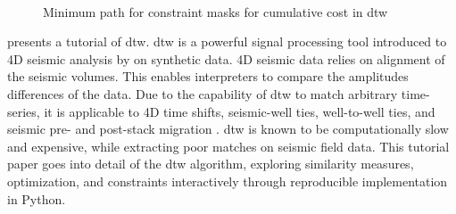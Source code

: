 \begin{figure}[!hb]
    ~
    ~
\caption{Minimum path for constraint masks for cumulative cost in \ac{dtw}}
\label{fig:constraints}
\end{figure} 
\citet{dramsch2019dtw} presents a tutorial of \acf{dtw}. \ac{dtw} is a powerful signal processing tool introduced to 4D seismic analysis by \citep{Hale2013} on synthetic data. 4D seismic data relies on alignment of the seismic volumes. This enables interpreters to compare the amplitudes differences of the data. Due to the capability of \ac{dtw} to match arbitrary time-series, it is applicable to 4D time shifts, seismic-well ties, well-to-well ties, and seismic pre- and post-stack migration \citep{Luo*2014}.  \ac{dtw} is known to be computationally slow and expensive, while extracting poor matches on seismic field data. This tutorial paper goes into detail of the \ac{dtw} algorithm, exploring similarity measures, optimization, and constraints interactively through reproducible implementation in Python.


